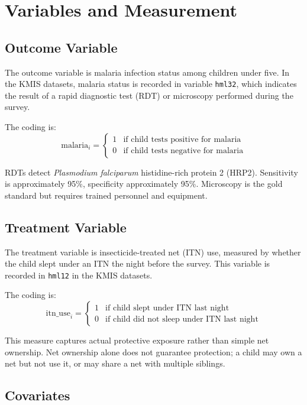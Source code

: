 \section{Variables and Measurement}

\subsection{Outcome Variable}

The outcome variable is malaria infection status among children under five. In the KMIS datasets, malaria status is recorded in variable \texttt{hml32}, which indicates the result of a rapid diagnostic test (RDT) or microscopy performed during the survey.

The coding is:
\[
\text{malaria}_i = \begin{cases}
	1 & \text{if child tests positive for malaria} \\[4pt]
	0 & \text{if child tests negative for malaria}
\end{cases}
\]

RDTs detect \textit{Plasmodium falciparum} histidine-rich protein 2 (HRP2). Sensitivity is approximately 95\%, specificity approximately 95\%. Microscopy is the gold standard but requires trained personnel and equipment.

\subsection{Treatment Variable}

The treatment variable is insecticide-treated net (ITN) use, measured by whether the child slept under an ITN the night before the survey. This variable is recorded in \texttt{hml12} in the KMIS datasets.

The coding is:
\[
\text{itn\_use}_i = \begin{cases}
	1 & \text{if child slept under ITN last night} \\[4pt]
	0 & \text{if child did not sleep under ITN last night}
\end{cases}
\]

This measure captures actual protective exposure rather than simple net ownership. Net ownership alone does not guarantee protection; a child may own a net but not use it, or may share a net with multiple siblings.

\subsection{Covariates}

